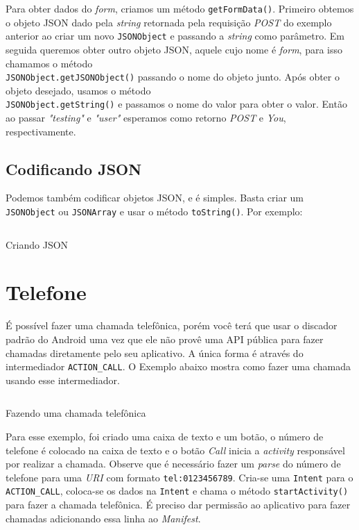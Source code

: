 \documentclass[a4paper,12pt,brazil,oneside]{book}
\begin{document}
		Para obter dados do \emph{form}, criamos um método \texttt{getFormData()}. Primeiro obtemos o objeto JSON dado pela \emph{string} retornada pela requisição \emph{POST} do exemplo anterior ao criar um novo \texttt{JSONObject} e passando a \emph{string} como parâmetro. Em seguida queremos obter outro objeto JSON, aquele cujo nome é \emph{form}, para isso chamamos o método \\ \texttt{JSONObject.getJSONObject()} passando o nome do objeto junto. Após obter o objeto desejado, usamos o método \\ \texttt{JSONObject.getString()} e passamos o nome do valor para obter o valor. Então ao passar \emph{"testing"} e \emph{"user"} esperamos como retorno \emph{POST} e \emph{You}, respectivamente. 

		\subsection{Codificando JSON}

		Podemos também codificar objetos JSON, e é simples. Basta criar um \texttt{JSONObject} ou \texttt{JSONArray} e usar o método \texttt{toString()}. Por exemplo:
	
		\begin{listing}[H]
		\inputminted[linenos=true,fontsize=\small,frame=lines, framesep=2mm, tabsize=2,numbersep=5pt]{java}{src/api/comm/writejson.java}
		\caption{Criando JSON}
		\label{code:jsonparser2}
		\end{listing} 

	\section{Telefone}
		
		É possível fazer uma chamada telefônica, porém você terá que usar o discador padrão do Android uma vez que ele não provê uma API pública para fazer chamadas diretamente pelo seu aplicativo. A única forma é através do intermediador \texttt{ACTION\_CALL}. O Exemplo abaixo mostra como fazer uma chamada usando esse intermediador.

		\begin{listing}[H]
		\inputminted[linenos=true,fontsize=\small,frame=lines, framesep=2mm, tabsize=2,numbersep=5pt]{java}{src/api/comm/phonecall.java}
		\caption{Fazendo uma chamada telefônica}
		\label{code:phonecall}
		\end{listing} 

		Para esse exemplo, foi criado uma caixa de texto e um botão, o número de telefone é colocado na caixa de texto e o botão \emph{Call} inicia a \emph{activity} responsável por realizar a chamada. Observe que é necessário fazer um \emph{parse} do número de telefone para uma \emph{URI} com formato \texttt{tel:0123456789}. Cria-se uma \texttt{Intent} para o \texttt{ACTION\_CALL}, coloca-se os dados na \texttt{Intent} e chama o método \texttt{startActivity()} para fazer a chamada telefônica. É preciso dar permissão ao aplicativo para fazer chamadas adicionando essa linha ao \emph{Manifest}.
	
\end{document}
